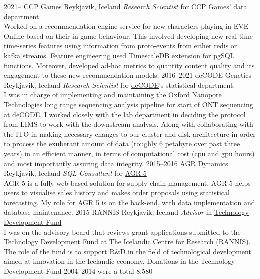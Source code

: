\documentclass[]{cv} %
\begin{document}
\begin{entrylist}
\entry
{2021--}
{CCP Games}
{Reykjavik, Iceland}
{\emph{Research Scientist} for
	\href{https://www.ccpgames.com/}{CCP Games}' data department.\\
	Worked on a recommendation engine service for new characters playing in EVE Online based on their in-game behaviour. This involved developing new real-time time-series features using information from proto-events from either redis or kafka streams. Feature engineering used TimescaleDB extension for pgSQL functions. Moreover, developed ad-hoc metrics to quantity content quality and its engagement to these new recommendation models.
}
\entry
{2016--2021}
{deCODE Genetics}
{Reykjavik, Iceland}
{\emph{Research Scientist} for
    \href{https://www.decode.com/}{deCODE}'s statistical department.\\
    I was in charge of implementing and maintaining the Oxford Nanopore Technologies long range sequencing analysis pipeline for start of ONT sequencing at deCODE. 
    I worked closely with the lab department in deciding the protocol from LIMS to work with the downstream analysis. Along with collaborating with the ITO in making necessary changes to our cluster and disk architecture in order to process the exuberant amount of data (roughly 6 petabyte over past three years) in an efficient manner, in terms of computational cost (cpu and gpu hours) and most importantly assuring data integrity. 
}
\entry
{2015--2016}
{AGR Dynamics}
{Reykjavik, Iceland}
{\emph{SQL Consultant} for
    \href{http://agrdynamics.com/}{AGR 5}\\
    AGR 5 is a fully web based solution for supply chain management. AGR 5 
    helps users to visualise sales history and makes order proposals using 
    statistical forecasting. My role for AGR 5 is on the back-end, with data 
    implementation and database maintenance.
}    
\entry
{2015}
{RANNIS}
{Reykjavik, Iceland}
{\emph{Advisor} in 
\href{http://www.rannis.is/sjodir/rannsoknir/taeknithrounarsjodur/fagrad/}{Technology
 Development Fund}\\
I was on the advisory board that reviews grant applications submitted to 
the  Technology Development Fund at The Icelandic Centre for Research (RANNIS).
The role of the fund is to support R$\&$D in the field of technological 
development aimed at innovation in the Icelandic economy.
Donations in the Technology Development Fund 2004--2014 were a total 8,580 
}
\end{entrylist}
\end{document}
